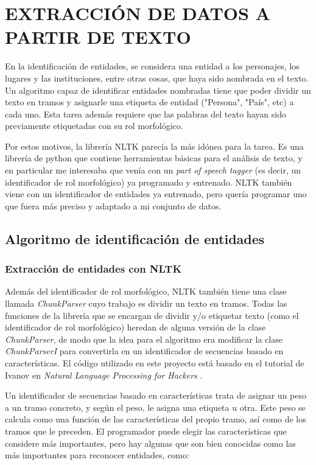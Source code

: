 \documentclass{pre-tfg}
\begin{document}
\cleardoublepage
\section {EXTRACCIÓN DE DATOS A PARTIR DE TEXTO}

En la identificación de entidades, se considera una entidad a los personajes, los lugares y las instituciones, entre otras cosas, que haya sido nombrada en el texto. Un algoritmo capaz de identificar entidades nombradas tiene que poder dividir un texto en tramos y asignarle una etiqueta de entidad ("Persona", "País", etc) a cada uno. Esta tarea además requiere que las palabras del texto hayan sido previamente etiquetadas con su rol morfológico.

Por estos motivos, la librería NLTK parecía la más idónea para la tarea. Es una librería de python que contiene herramientas básicas para el análisis de texto, y en particular me interesaba que venía con un \textit{part of speech tagger} (es decir, un identificador de rol morfológico) ya programado y entrenado. NLTK también viene con un identificador de entidades ya entrenado, pero quería programar uno que fuera más preciso y adaptado a mi conjunto de datos.



\subsection{Algoritmo de identificación de entidades}

\subsubsection{Extracción de entidades con NLTK}
\label{sec:nerextract_tagger}
Además del identificador de rol morfológico, NLTK también tiene una clase llamada \textit{ChunkParser} cuyo trabajo es dividir un texto en tramos. Todas las funciones de la librería que se encargan de dividir y/o etiquetar texto (como el identificador de rol morfológico) heredan de alguna versión de la clase \textit{ChunkParser}, de modo que la idea para el algoritmo era modificar la clase \textit{ChunkParserI} para convertirla en un identificador de secuencias basado en características. El código utilizado en este proyecto está basado en el tutorial de Ivanov en \textit{Natural Language Processing for Hackers} \cite{ivanov_2016}.

Un identificador de secuencias basado en características trata de asignar un peso a un tramo concreto, y según el peso, le asigna una etiqueta u otra. Este peso se calcula como una función de las características del propio tramo, así como de los tramos que le preceden.
El programador puede elegir las características que considere más importantes, pero hay algunas que son bien conocidas como las más importantes para reconocer entidades, como:
\end{document}
